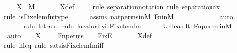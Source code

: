 \begin{isabellebody}
\isanewline
\ \ \isamarkupfalse%
\ {\isachardoublequoteopen}X\ {\isasymin}\ M{\isachardoublequoteclose}\ \isanewline
\ \ \ \ \isamarkupfalse%
\ X{\isacharunderscore}{\kern0pt}def\isanewline
\ \ \ \ \isamarkupfalse%
{\isacharparenleft}{\kern0pt}rule\ separation{\isacharunderscore}{\kern0pt}notation{\isacharcomma}{\kern0pt}\ rule\ separation{\isacharunderscore}{\kern0pt}ax{\isacharparenright}{\kern0pt}\isanewline
\ \ \ \ \ \ \ \isamarkupfalse%
{\isacharparenleft}{\kern0pt}rule\ is{\isacharunderscore}{\kern0pt}Fix{\isacharunderscore}{\kern0pt}elem{\isacharunderscore}{\kern0pt}fm{\isacharunderscore}{\kern0pt}type{\isacharparenright}{\kern0pt}\isanewline
\ \ \ \ \isamarkupfalse%
\ assms\ nat{\isacharunderscore}{\kern0pt}perms{\isacharunderscore}{\kern0pt}in{\isacharunderscore}{\kern0pt}M\ Fn{\isacharunderscore}{\kern0pt}in{\isacharunderscore}{\kern0pt}M\ \isanewline
\ \ \ \ \ \ \ \ \ \ \isamarkupfalse%
\ auto{\isacharbrackleft}{\kern0pt}{}{\isacharbrackright}{\kern0pt}\isanewline
\ \ \ \ \ \isamarkupfalse%
{\isacharparenleft}{\kern0pt}rule\ le{\isacharunderscore}{\kern0pt}trans{\isacharcomma}{\kern0pt}\ rule\ local{\isachardot}{\kern0pt}arity{\isacharunderscore}{\kern0pt}is{\isacharunderscore}{\kern0pt}Fix{\isacharunderscore}{\kern0pt}elem{\isacharunderscore}{\kern0pt}fm{\isacharparenright}{\kern0pt}\isanewline
\ \ \ \ \isamarkupfalse%
\ Un{\isacharunderscore}{\kern0pt}least{\isacharunderscore}{\kern0pt}lt\ Fn{\isacharunderscore}{\kern0pt}perms{\isacharunderscore}{\kern0pt}in{\isacharunderscore}{\kern0pt}M\isanewline
\ \ \ \ \isamarkupfalse%
\ auto\isanewline
\ \ \isamarkupfalse%
\ {\isachardoublequoteopen}X\ {\isacharequal}{\kern0pt}\ {\isacharbraceleft}{\kern0pt}\ {\isasympi}\ {\isasymin}\ Fn{\isacharunderscore}{\kern0pt}perms\ {\isachardot}{\kern0pt}\ {\isasympi}\ {\isasymin}\ Fix{\isacharparenleft}{\kern0pt}E{\isacharparenright}{\kern0pt}\ {\isacharbraceright}{\kern0pt}{\isachardoublequoteclose}\isanewline
\ \ \ \ \isamarkupfalse%
\ X{\isacharunderscore}{\kern0pt}def\isanewline
\ \ \ \ \isamarkupfalse%
{\isacharparenleft}{\kern0pt}rule\ iff{\isacharunderscore}{\kern0pt}eq{\isacharcomma}{\kern0pt}\ rule\ sats{\isacharunderscore}{\kern0pt}is{\isacharunderscore}{\kern0pt}Fix{\isacharunderscore}{\kern0pt}elem{\isacharunderscore}{\kern0pt}fm{\isacharunderscore}{\kern0pt}iff{\isacharparenright}{\kern0pt}\isanewline
\ \ \ \ \isamarkupfalse%

\end{isabellebody}
